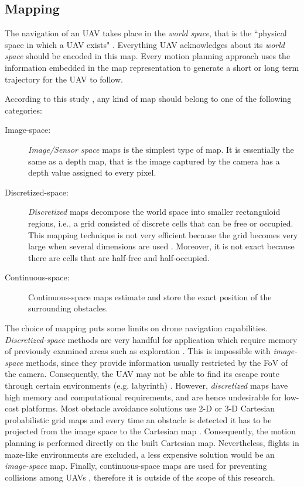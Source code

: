 \subsection{Mapping}\label{ch:literature:obstacle_avoidance:navigation:mapping}


The navigation of an \ac{UAV} takes place in the \textit{world space}, that is the ``physical space in which a \ac{UAV} exists" \cite{Goerzen2010a}. Everything \ac{UAV} acknowledges about its \textit{world space }should be encoded in this map. Every motion planning approach uses the information embedded in the map representation to generate a short or long term trajectory for the \ac{UAV} to follow. 

According to this study \cite{Dijk}, any kind of map should belong to one of the following categories: 

\begin{description}
	\item[Image-space: ]\textit{Image/Sensor space} maps is the simplest type of map. It is essentially the same as a depth map, that is the image captured by the camera has a depth value assigned to every pixel.
	\item[Discretized-space: ]\textit{Discretized }maps decompose the world space into smaller rectanguloid regions, i.e., a grid consisted of discrete cells that can be free or occupied. This mapping technique is not very efficient because the grid becomes very large when several dimensions are used . Moreover, it is not exact because there are cells that are half-free and half-occupied.
	\item[Continuous-space: ]Continuous-space maps estimate and store the exact position of the surrounding obstacles.
\end{description}

  
The choice of mapping puts some limits on drone navigation capabilities. \textit{Discretized-space} methods are very handful for application which require memory of previously examined areas such as exploration \cite{Brockers2016b}. This is impossible with \textit{image-space} methods, since they provide information usually restricted by the \ac{FoV} of the camera. Consequently, the \ac{UAV} may not be able to find its escape route through certain environments (e.g. labyrinth) \cite{Dijk}. However, \textit{discretized} maps have high memory and computational requirements, and are hence undesirable for low-cost platforms. Most obstacle avoidance solutions use 2-D or 3-D Cartesian probabilistic grid maps and every time an obstacle is detected it has to be projected from the image space to the Cartesian map \cite{Brockers2016b}. Consequently, the motion planning is performed directly on the built Cartesian map. Nevertheless, flights in maze-like environments are excluded, a less expensive solution would be an \textit{image-space} map. Finally, continuous-space maps are used for preventing collisions among \acp{UAV} \cite{Dijk}, therefore it is outside of the scope of this research.

